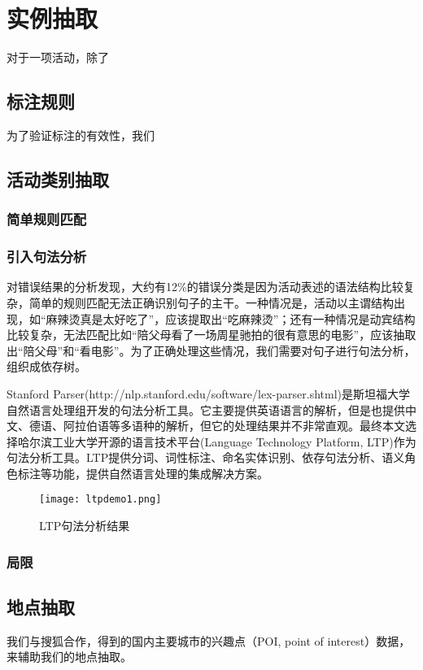 \chapter{实例抽取}
对于一项活动，除了
\section{标注规则}
为了验证标注的有效性，我们


\section{活动类别抽取}
\subsection{简单规则匹配}
\subsection{引入句法分析}
对错误结果的分析发现，大约有12\%的错误分类是因为活动表述的语法结构比较复杂，简单的规则匹配无法正确识别句子的主干。一种情况是，活动以主谓结构出现，如``麻辣烫真是太好吃了''，应该提取出``吃麻辣烫''；还有一种情况是动宾结构比较复杂，无法匹配比如``陪父母看了一场周星驰拍的很有意思的电影''，应该抽取出``陪父母''和``看电影''。为了正确处理这些情况，我们需要对句子进行句法分析，组织成依存树。

Stanford Parser(http://nlp.stanford.edu/software/lex-parser.shtml)是斯坦福大学自然语言处理组开发的句法分析工具。它主要提供英语语言的解析，但是也提供中文、德语、阿拉伯语等多语种的解析，但它的处理结果并不非常直观。最终本文选择哈尔滨工业大学开源的语言技术平台(Language Technology Platform, LTP)\cite{che2010ltp}作为句法分析工具。LTP提供分词、词性标注、命名实体识别、依存句法分析、语义角色标注等功能，提供自然语言处理的集成解决方案。

\begin{figure}[!h]
\centering
\texttt{[image: ltpdemo1.png]}
\caption{LTP句法分析结果}
\label{fig:ltp_demo}
\end{figure}


\subsection{局限}

\section{地点抽取}

我们与搜狐合作，得到的国内主要城市的兴趣点（POI, point of interest）数据，来辅助我们的地点抽取。

